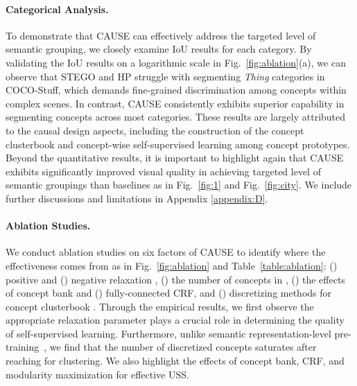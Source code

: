 \documentclass{article} \usepackage{iclr2024_conference,times}
\begin{document}
\paragraph{Categorical Analysis.} To demonstrate that CAUSE can effectively address the targeted level of semantic grouping, we closely examine IoU results for each category. By validating the IoU results on a logarithmic scale in Fig.~\ref{fig:ablation}(a), we can observe that STEGO and HP struggle with segmenting \textit{Thing} categories in COCO-Stuff, which demands fine-grained discrimination among concepts within complex scenes. In contrast, CAUSE consistently exhibits superior capability in segmenting concepts across most categories. These results are largely attributed to the causal design aspects, including the construction of the concept clusterbook and concept-wise self-supervised learning among concept prototypes. Beyond the quantitative results, it is important to highlight again that CAUSE exhibits significantly improved visual quality in achieving targeted level of semantic groupings than baselines as in Fig.~\ref{fig:1} and Fig.~\ref{fig:city}. We include further discussions and limitations in Appendix \ref{appendix:D}.


\paragraph{Ablation Studies.} We conduct ablation studies on six factors of CAUSE to identify where the effectiveness comes from as in Fig.~\ref{fig:ablation} and Table~\ref{table:ablation}: (\lowercase\expandafter{}) positive  and (\lowercase\expandafter{}) negative relaxation , (\lowercase\expandafter{}) the number of concepts  in , (\lowercase\expandafter{}) the effects of concept bank  and (\lowercase\expandafter{}) fully-connected CRF, and (\lowercase\expandafter{}) discretizing methods for concept clusterbook . Through the empirical results, we first observe the appropriate relaxation parameter plays a crucial role in determining the quality of self-supervised learning. Furthermore, unlike semantic representation-level pre-training~\citep{bao2022beit}, we find that the number of discretized concepts saturates after reaching  for clustering. We also highlight the effects of concept bank, CRF, and modularity maximization for effective USS. 
\end{document}
